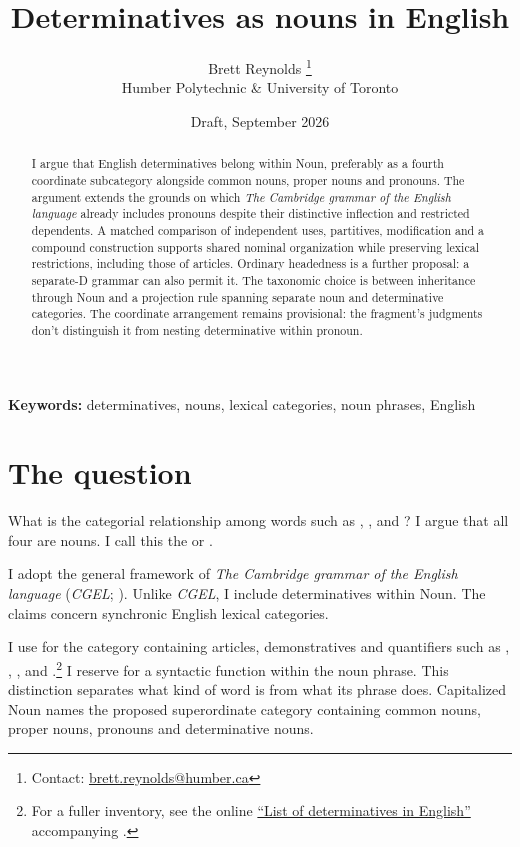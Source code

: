 \documentclass[12pt]{article}
\title{Determinatives as nouns in English}
\author{Brett Reynolds \orcidlink{0000-0003-0073-7195}%
\thanks{Contact: \href{mailto:brett.reynolds@humber.ca}{brett.reynolds@humber.ca}}\\
Humber Polytechnic \& University of Toronto}
\date{Draft, September 2026}
\begin{document}
\maketitle

\begin{abstract}
I argue that English determinatives belong within Noun, preferably as a fourth coordinate subcategory alongside common nouns, proper nouns and pronouns. The argument extends the grounds on which \textit{The Cambridge grammar of the English language} already includes pronouns despite their distinctive inflection and restricted dependents. A matched comparison of independent uses, partitives, modification and a compound construction supports shared nominal organization while preserving lexical restrictions, including those of articles. Ordinary headedness is a further proposal: a separate-D grammar can also permit it. The taxonomic choice is between inheritance through Noun and a projection rule spanning separate noun and determinative categories. The coordinate arrangement remains provisional: the fragment's judgments don't distinguish it from nesting determinative within pronoun.
\end{abstract}

\noindent\textbf{Keywords:} determinatives, nouns, lexical categories, noun phrases, English

\section{The question}\label{sec:intro}

What is the categorial relationship among words such as , ,  and ? I argue that all four are nouns. I call this the  or .

I adopt the general framework of \textit{The Cambridge grammar of the English language} (\textit{CGEL}; \citealt{huddleston2002}). Unlike \textit{CGEL}, I include determinatives within Noun. The claims concern synchronic English lexical categories.

I use  for the category containing articles, demonstratives and quantifiers such as , , ,  and .\footnote{For a fuller inventory, see the online \href{https://www.cambridge.org/highereducation/api/resources/2AC8DF5CA558F8A6FCDFACD0EAF8EA08}{\enquote{List of determinatives in English}} accompanying \textcite{Huddleston2021}.} I reserve  for a syntactic function within the noun phrase. This distinction separates what kind of word  is from what its phrase does. Capitalized Noun names the proposed superordinate category containing common nouns, proper nouns, pronouns and determinative nouns.
\end{document}
